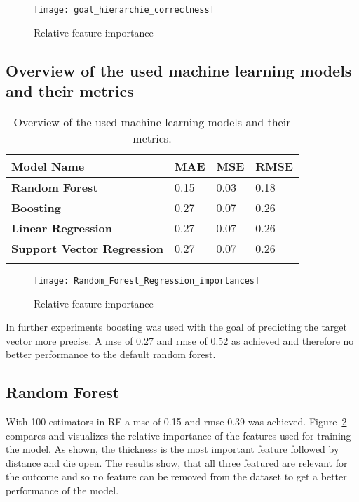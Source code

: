 \begin{figure}[H]
    \centering
    \texttt{[image: goal\_hierarchie\_correctness]}
    \caption{Relative feature importance}
    \label{fig:goal_hierarchie_correctness}
\end{figure}


\subsection{Overview of the used machine learning models and their metrics}
\begin{longtable}{l|l|l|l}
    \textbf{Model Name} & \textbf{MAE} & \textbf{MSE} & \textbf{RMSE} \\
    \hline
    \textbf{Random Forest} & 0.15 & 0.03 & 0.18 \\
    \hline
    \textbf{Boosting} & 0.27 & 0.07 & 0.26 \\
    \hline
    \textbf{Linear Regression} & 0.27 & 0.07 & 0.26 \\
    \hline
    \textbf{Support Vector Regression} & 0.27 & 0.07 & 0.26 \\
    \hline
    \caption{Overview of the used machine learning models and their metrics.}
    \label{tab:ml_models}
\end{longtable}




\begin{figure}[H]
    \centering
    \texttt{[image: Random\_Forest\_Regression\_importances]}
    \caption{Relative feature importance}
    \label{fig:rf_feature_importance}
\end{figure}

In further experiments boosting was used with the goal of predicting the target vector more precise. A \ac{mse} of 0.27 and \ac{rmse} of 0.52 as achieved and therefore no better performance to the default random forest.


\subsection{Random Forest}
With 100 estimators in \ac{RF} a \ac{mse} of 0.15 and \ac{rmse} 0.39 was achieved.
Figure~\ref{fig:rf_feature_importance} compares and visualizes the relative importance of the features used for training the model.
As shown, the thickness is the most important feature followed by distance and die open. The results show, that all three featured are relevant for the outcome and so no feature can be removed from the dataset to get a better performance of the model.



